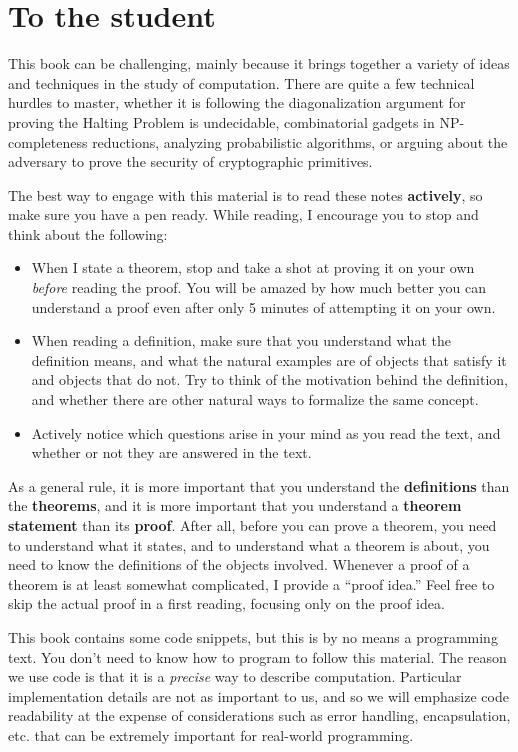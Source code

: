 \section{To the student}\label{To-the-student}

This book can be challenging, mainly because it brings together a
variety of ideas and techniques in the study of computation. There are
quite a few technical hurdles to master, whether it is following the
diagonalization argument for proving the Halting Problem is undecidable,
combinatorial gadgets in NP-completeness reductions, analyzing
probabilistic algorithms, or arguing about the adversary to prove the
security of cryptographic primitives.

The best way to engage with this material is to read these notes
\textbf{actively}, so make sure you have a pen ready. While reading, I
encourage you to stop and think about the following:

\begin{itemize}
\item
  When I state a theorem, stop and take a shot at proving it on your own
  \emph{before} reading the proof. You will be amazed by how much better
  you can understand a proof even after only 5 minutes of attempting it
  on your own.
\item
  When reading a definition, make sure that you understand what the
  definition means, and what the natural examples are of objects that
  satisfy it and objects that do not. Try to think of the motivation
  behind the definition, and whether there are other natural ways to
  formalize the same concept.
\item
  Actively notice which questions arise in your mind as you read the
  text, and whether or not they are answered in the text.
\end{itemize}

As a general rule, it is more important that you understand the
\textbf{definitions} than the \textbf{theorems}, and it is more
important that you understand a \textbf{theorem statement} than its
\textbf{proof}. After all, before you can prove a theorem, you need to
understand what it states, and to understand what a theorem is about,
you need to know the definitions of the objects involved. Whenever a
proof of a theorem is at least somewhat complicated, I provide a ``proof
idea.'' Feel free to skip the actual proof in a first reading, focusing
only on the proof idea.

This book contains some code snippets, but this is by no means a
programming text. You don't need to know how to program to follow this
material. The reason we use code is that it is a \emph{precise} way to
describe computation. Particular implementation details are not as
important to us, and so we will emphasize code readability at the
expense of considerations such as error handling, encapsulation, etc.
that can be extremely important for real-world programming.

